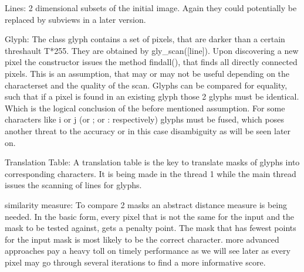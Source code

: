Lines: 2 dimensional subsets of the initial image. Again they could potentially be replaced by subviews in a later version.\newline

Glyph: The class glyph contains a set of pixels, that are darker than a certain threshault T*255. They are obtained by gly_scan([line]). Upon discovering a new pixel the constructor issues the method findall(), that finds all directly connected pixels. This is an assumption, that may or may not be useful depending on the characterset and the quality of the scan.\newline
Glyphs can be compared for equality, such that if a pixel is found in an existing glyph those 2 glyphs must be identical. Which is the logical conclusion of the before mentioned assumption.\newline
For some characters like i or j (or ; or : respectively) glyphs must be fused, which poses another threat to the accuracy or in this case disambiguity as will be seen later on.\newline

Translation Table: A translation table is the key to translate masks of glyphs into corresponding characters. It is being made in the thread 1 while the main thread issues the scanning of lines for glyphs.

similarity measure: To compare 2 masks an abstract distance measure is being needed. In the basic form, every pixel that is not the same for the input and the mask to be tested against, gets a penalty point. The mask that has fewest points for the input mask is most likely to be the correct character.\newline
more advanced approaches pay a heavy toll on timely performance as we will see later as every pixel may go through several iterations to find a more informative score.\newline



